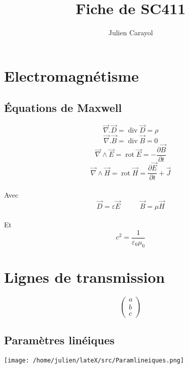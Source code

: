 \documentclass{article}
\author{Julien Carayol}
\title{Fiche de SC411}
\DeclareMathOperator{\Div}{div}
\DeclareMathOperator{\Rot}{rot}
\newcommand{\parder}[2]{\frac{\partial {#1}}{\partial {#2}}}
\begin{document}
\newpage
\section{Electromagnétisme}
\subsection{Équations de Maxwell}

  \[\vec{\nabla}.\vec{D}=\Div\vec{D}=\rho\]
  \[\vec{\nabla}.\vec{B}=\Div\vec{B}=0\]
  \[\vec{\nabla}\wedge\vec{E}=\Rot\vec{E}=-\parder{\vec{B}}{t}\]
\[\vec{\nabla}\wedge\vec{H}=\Rot\vec{H}=\parder{\vec{E}}{t} +\vec{J} \]
\\Avec
\[\vec{D}=\varepsilon\vec{E}\;\;\;\;\;\;\;\;\;\;\vec{B}=\mu\vec{H}\]
\\Et \[c^2=\frac{1}{\varepsilon_0\mu_0}\]
\section{Lignes de transmission}
\[\left( \begin{array}{c}
a\\
b\\
c
\end{array} \right)\]
\subsection{Paramètres linéiques}
\begin{center}
  \texttt{[image: /home/julien/lateX/src/Paramlineiques.png]}
\end{center}
\end{document}
